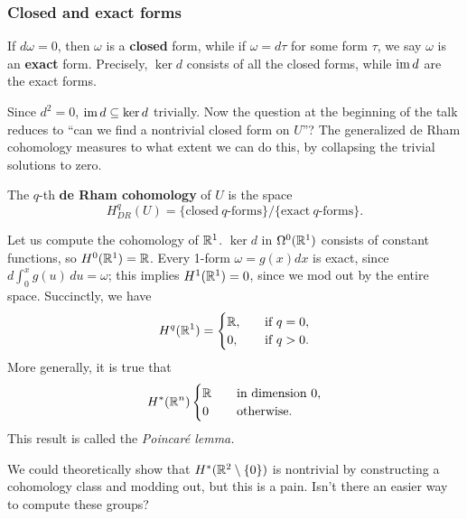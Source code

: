 \documentclass[xcolor=dvipsnames]{beamer}
\begin{document}
\begin{frame}
    \frametitle{Closed and exact forms} 
\begin{definition}[]
    If $d\omega=0$, then $\omega$ is a \textbf{closed} form, while if $\omega=d\tau$ for some form $\tau$, we say $\omega$ is an \textbf{exact} form.  Precisely, $\ker d$ consists of all the closed forms, while $\operatorname{im} d$ are the exact forms.
\end{definition}%
Since $d^2=0$, $\operatorname{im} d \subseteq \ker d$ trivially. Now the question at the beginning of the talk reduces to ``can we find a nontrivial closed form on $U$''? The generalized de Rham cohomology measures to what extent we can do this, by collapsing the trivial solutions to zero.
\pause
\begin{definition}[]
   The $q$-th \textbf{de Rham cohomology} of $U$ is the space \[
       H_{DR}^q(U)=\{\text{closed} \ q\text{-forms} \} / \{\text{exact} \ q\text{-forms} \} .
   \]  
\end{definition}
\end{frame}

\begin{frame}
    \begin{example}
        Let us compute the cohomology of $\mathbb{R}^1$. $\ker d$ in $\Omega^0(\mathbb{R}^1)$ consists of constant functions, so $H^0(\mathbb{R}^1)=\mathbb{R}$. Every 1-form $\omega=g(x)dx$ is exact, since $d \int_{0}^{x} g(u) \, du=\omega$; this implies $H^1(\mathbb{R}^1)=0$, since we mod out by the entire space. Succinctly, we have
        \[
            H^q(\mathbb{R}^1)=\begin{cases}
                \mathbb{R},\quad &\text{if} \ q=0,\\
                0,& \text{if} \ q>0.
        \end{cases}
        \] More generally, it is true that
        \[
            H^*(\mathbb{R}^n )\begin{cases}
            \mathbb{R} \quad & \text{in dimension} \ 0,\\
            0 & \text{otherwise.}
        \end{cases}
        \] This result is called the \emph{Poincar\'e lemma.} 
    \end{example}\pause
    We could theoretically show that $H^*(\mathbb{R}^2 \setminus \{0\} ) $ is nontrivial by constructing a cohomology class and modding out, but this is a pain. Isn't there an easier way to compute these groups?
\end{frame}
\end{document}
